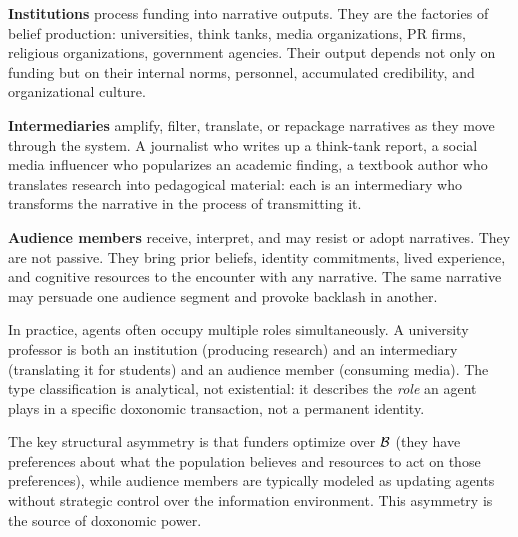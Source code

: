\textbf{Institutions} process funding into narrative outputs.
They are the factories of belief production: universities, think tanks, media organizations, PR firms, religious organizations, government agencies.
Their output depends not only on funding but on their internal norms, personnel, accumulated credibility, and organizational culture.

\textbf{Intermediaries} amplify, filter, translate, or repackage narratives as they move through the system.
A journalist who writes up a think-tank report, a social media influencer who popularizes an academic finding, a textbook author who translates research into pedagogical material: each is an intermediary who transforms the narrative in the process of transmitting it.

\textbf{Audience members} receive, interpret, and may resist or adopt narratives.
They are not passive.
They bring prior beliefs, identity commitments, lived experience, and cognitive resources to the encounter with any narrative.
The same narrative may persuade one audience segment and provoke backlash in another.

\begin{remark}
\label{rem:agent-dual-roles}
In practice, agents often occupy multiple roles simultaneously.
A university professor is both an institution (producing research) and an intermediary (translating it for students) and an audience member (consuming media).
The type classification is analytical, not existential: it describes the \emph{role} an agent plays in a specific doxonomic transaction, not a permanent identity.
\end{remark}

The key structural asymmetry is that funders optimize over $\mathcal{B}$ (they have preferences about what the population believes and resources to act on those preferences), while audience members are typically modeled as updating agents without strategic control over the information environment.
This asymmetry is the source of doxonomic power.


